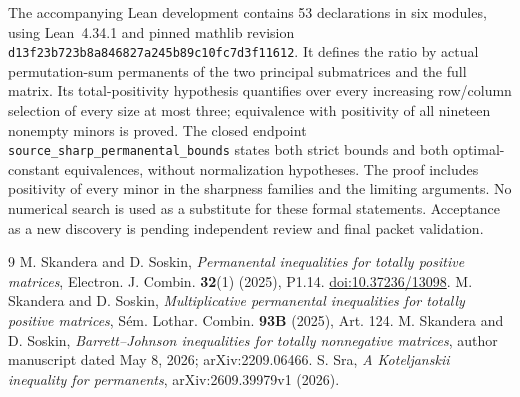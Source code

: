\documentclass[11pt]{article}
\begin{document}
The accompanying Lean development contains 53 declarations in six modules,
using Lean~4.34.1 and pinned mathlib revision
\texttt{d13f23b723b8a846827a245b89c10fc7d3f11612}.
It defines the ratio by actual permutation-sum permanents of the two
principal submatrices and the full matrix. Its total-positivity hypothesis
quantifies over every increasing row/column selection of every size at most
three; equivalence with positivity of all nineteen nonempty minors is proved.
The closed endpoint \texttt{source\_sharp\_permanental\_bounds} states both
strict bounds and both optimal-constant equivalences, without normalization
hypotheses. The proof includes positivity of every minor in the sharpness
families and the limiting arguments. No numerical search is used as a
substitute for these formal statements. Acceptance as a new discovery is
pending independent review and final packet validation.

\begin{thebibliography}{9}
 M. Skandera and D. Soskin,
\emph{Permanental inequalities for totally positive matrices},
Electron. J. Combin. \textbf{32}(1) (2025), P1.14.
\href{https://doi.org/10.37236/13098}{doi:10.37236/13098}.
 M. Skandera and D. Soskin,
\emph{Multiplicative permanental inequalities for totally positive matrices},
S\'em. Lothar. Combin. \textbf{93B} (2025), Art. 124.
 M. Skandera and D. Soskin,
\emph{Barrett--Johnson inequalities for totally nonnegative matrices},
author manuscript dated May 8, 2026; arXiv:2209.06466.
 S. Sra, \emph{A Koteljanskii inequality for permanents},
arXiv:2609.39979v1 (2026).
\end{thebibliography}
\end{document}
